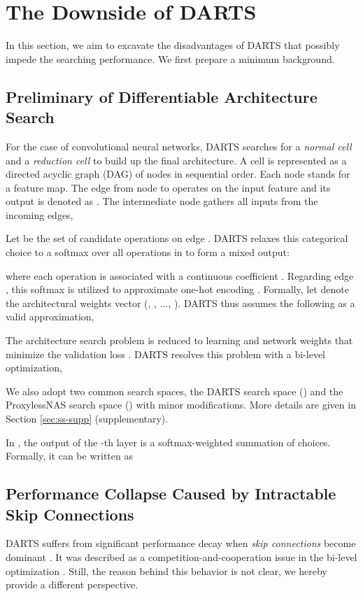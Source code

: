 \documentclass[runningheads]{llncs}
\begin{document}
\section{The Downside of DARTS}
In this section, we aim to excavate the disadvantages of DARTS that possibly impede the searching performance. We first prepare a minimum background.

\subsection{Preliminary of Differentiable Architecture Search}
For the case of convolutional neural networks, DARTS \cite{liu2018darts} searches for a \emph{normal cell} and a \emph{reduction cell} to build up the final architecture. A cell is represented as a directed acyclic graph (DAG) of  nodes in sequential order.  Each node stands for a feature map. The edge  from node  to  operates on the input feature  and its output is denoted as . The intermediate node  gathers all inputs from the incoming edges,


Let  be the set of  candidate operations on edge . DARTS relaxes this categorical choice to a softmax  over all operations in  to form a mixed output:

where each operation  is associated with a continuous coefficient . Regarding edge , this softmax is utilized to approximate one-hot encoding . Formally, let  denote the architectural weights vector (, , ..., ). DARTS thus assumes the following as a valid approximation,


The architecture search problem is reduced to learning  and network weights  that minimize the validation loss . DARTS resolves this problem with a bi-level optimization, 


We also adopt two common search spaces, the DARTS \cite{liu2018darts} search space () and the ProxylessNAS \cite{cai2018proxylessnas} search space () with minor modifications. More details are given in Section \ref{sec:ss-supp} (supplementary).

In , the output of the -th layer is a softmax-weighted summation of  choices. Formally, it can be written as
 

\subsection{Performance Collapse Caused by Intractable Skip Connections}{\label{sec:skip}}
DARTS suffers from significant performance decay when \emph{skip connections} become dominant \cite{chen2019progressive,liang2019darts}. It was described as a competition-and-cooperation issue in the bi-level optimization \cite{liang2019darts}. Still, the reason behind this behavior is not clear, we hereby provide a different perspective.
\end{document}
